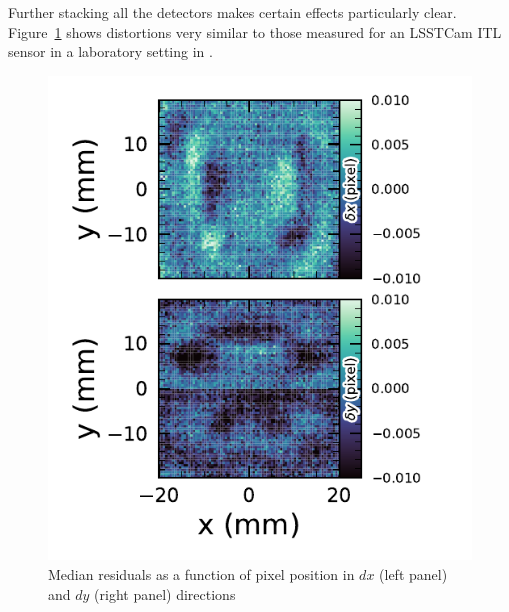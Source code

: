 Further stacking all the detectors makes certain effects particularly clear.
Figure~\ref{fig:Astrometry_CCD} shows distortions very similar to those measured for an \gls{LSSTCam} \gls{ITL} sensor in a laboratory setting in \citet{2023PASP..135k5003E}.
\begin{figure}[htb!]
\centering
\includegraphics[width=1.0\linewidth]{Astrometry_CCD.pdf}
\caption{\small Median residuals as a function of pixel position in $dx$ (left panel) and $dy$ (right panel) directions}
\label{fig:Astrometry_CCD}
\end{figure}

